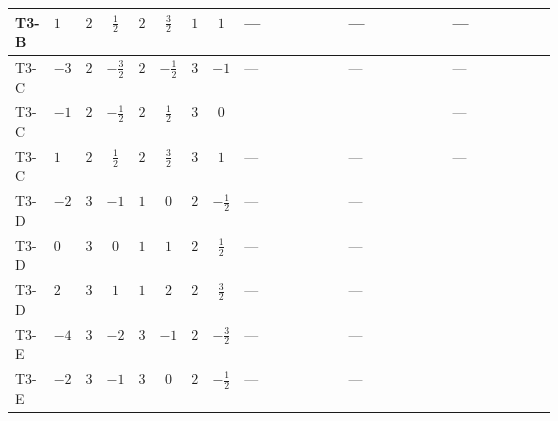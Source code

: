 \documentclass[8pt]{article}
\begin{document}
\begin{landscape}
\begin{longtable}{@{}llcccccc >{\raggedright\arraybackslash}p{0.21\linewidth} >{\raggedright\arraybackslash}p{0.21\linewidth} >{\raggedright\arraybackslash}p{0.21\linewidth}@{}}
T3-B & $1$ & $2$ & $\frac{1}{2}$ & $2$ & $\frac{3}{2}$ & $1$ & $1$ & --- & --- & --- \\
\midrule
T3-C & $-3$ & $2$ & $-\frac{3}{2}$ & $2$ & $-\frac{1}{2}$ & $3$ & $-1$ & --- & --- & --- \\
\midrule
T3-C & $-1$ & $2$ & $-\frac{1}{2}$ & $2$ & $\frac{1}{2}$ & $3$ & $0$ & \scriptsize\adjustbox{max width=\linewidth}{$\begin{gathered} +8 {\lambda_{7}} \left({\lambda_{7}}\right)^{*}\end{gathered}$} & \scriptsize\adjustbox{max width=\linewidth}{$\begin{gathered} +8 {\lambda_{9}} \left({\lambda_{9}}\right)^{*}\end{gathered}$} & --- \\
\midrule
T3-C & $1$ & $2$ & $\frac{1}{2}$ & $2$ & $\frac{3}{2}$ & $3$ & $1$ & --- & --- & --- \\
\midrule
T3-D & $-2$ & $3$ & $-1$ & $1$ & $0$ & $2$ & $-\frac{1}{2}$ & --- & --- & \scriptsize\adjustbox{max width=\linewidth}{$\begin{gathered} {\lambda_{S_1}^{(1)}} (4 T_{\nu}^{(1)}+14 {\lambda_{S_1}^{(A)}})\end{gathered}$} \\
\midrule
T3-D & $0$ & $3$ & $0$ & $1$ & $1$ & $2$ & $\frac{1}{2}$ & --- & --- & \scriptsize\adjustbox{max width=\linewidth}{$\begin{gathered} {\lambda_{S_1}^{(1)}} (4 T_{\nu}^{(1)}+14 {\lambda_{S_1}^{(A)}})\end{gathered}$} \\
\midrule
T3-D & $2$ & $3$ & $1$ & $1$ & $2$ & $2$ & $\frac{3}{2}$ & --- & --- & \scriptsize\adjustbox{max width=\linewidth}{$\begin{gathered} {\lambda_{S_1}^{(1)}} (4 T_{\nu}^{(1)}+14 {\lambda_{S_1}^{(A)}})\end{gathered}$} \\
\midrule
T3-E & $-4$ & $3$ & $-2$ & $3$ & $-1$ & $2$ & $-\frac{3}{2}$ & --- & --- & \scriptsize\adjustbox{max width=\linewidth}{$\begin{gathered} {\lambda_{S_1}^{(1)}} (4 T_{\nu}^{(1)}+14 {\lambda_{S_1}^{(A)}})\end{gathered}$} \\
\midrule
T3-E & $-2$ & $3$ & $-1$ & $3$ & $0$ & $2$ & $-\frac{1}{2}$ & --- & --- & \scriptsize\adjustbox{max width=\linewidth}{$\begin{gathered} {\lambda_{S_1}^{(1)}} (4 T_{\nu}^{(1)}+14 {\lambda_{S_1}^{(A)}})\end{gathered}$} \\

\end{longtable}
\end{landscape}
\end{document}
